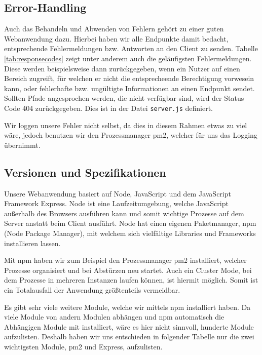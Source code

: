 \subsection{Error-Handling}
\label{sec:nodechapter-error-handling}
Auch das Behandeln und Abwenden von Fehlern gehört zu einer guten Webanwendung dazu. Hierbei haben
wir alle Endpunkte damit bedacht, entsprechende Fehlermeldungen bzw. Antworten an den Client zu senden.
Tabelle \ref{tab:responsecodes} zeigt unter anderem auch die geläufigsten Fehlermeldungen. Diese werden
beispielsweise dann zurückgegeben, wenn ein Nutzer auf einen Bereich zugreift, für welchen
er nicht die entsprecheende Berechtigung vorwesein kann, oder fehlerhafte bzw. ungültigte Informationen an
einen Endpunkt sendet. Sollten Pfade angesprochen werden, die nicht verfügbar sind, wird der Status Code 404
zurückgegeben. Dies ist in der Datei \verb|server.js| definiert.

Wir loggen unsere Fehler nicht selbst, da dies in diesem Rahmen
etwas zu viel wäre, jedoch benutzen wir den Prozessmanager pm2, welcher für uns das Logging übernimmt.\\


\subsection{Versionen und Spezifikationen}
\label{sec:nodechapter-versions}
Unsere Webanwendung basiert auf Node, JavaScript und dem JavaScript Framework Express. Node ist eine Laufzeitumgebung,
welche JavaScript außerhalb des Browsers ausführen kann und somit wichtige Prozesse auf dem Server anstatt beim Client ausführt.
Node hat einen eigenen Paketmanager, npm (Node Package Manager), mit welchem sich vielfältige Libraries und Frameworks installieren lassen.

Mit npm haben wir zum Beispiel den Prozessmanager pm2 installiert, welcher Prozesse organisiert und bei Abstürzen
neu startet. Auch ein Cluster Mode, bei dem Prozesse in mehreren Instanzen laufen können, ist hiermit möglich. Somit
ist ein Totalausfall der Anwendung größtenteils vermeidbar.

Es gibt sehr viele weitere Module, welche wir mittels npm installiert haben. Da viele Module von andern Modulen abhängen
und npm automatisch die Abhängigen Module mit installiert, wäre es hier nicht sinnvoll, hunderte Module aufzulisten.
Deshalb haben wir uns entschieden in folgender Tabelle nur die zwei wichtigsten Module, pm2 und Express, aufzulisten.

